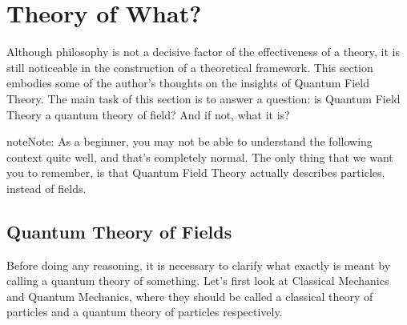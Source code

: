 \documentclass[letterpaper,10pt,english]{sphinxmanual}
\begin{document}
\section{Theory of What?}
\label{\detokenize{theo_what:theory-of-what}}\label{\detokenize{theo_what::doc}}
Although philosophy is not a decisive factor of the effectiveness of a theory, it is still noticeable in the construction of a theoretical framework. This section embodies some of the author's thoughts on the insights of Quantum Field Theory. The main task of this section is to answer a question: is Quantum Field Theory a quantum theory of field? And if not, what it is?

\begin{sphinxadmonition}{note}{Note:}
As a beginner, you may not be able to understand the following context quite well, and that's completely normal. The only thing that we want you to remember, is that Quantum Field Theory actually describes particles, instead of fields.
\end{sphinxadmonition}


\subsection{Quantum Theory of Fields}
\label{\detokenize{theo_what:quantum-theory-of-fields}}
Before doing any reasoning, it is necessary to clarify what exactly is meant by calling a quantum theory of something. Let's first look at Classical Mechanics and Quantum Mechanics, where they should be called a classical theory of particles and a quantum theory of particles respectively.
\end{document}

